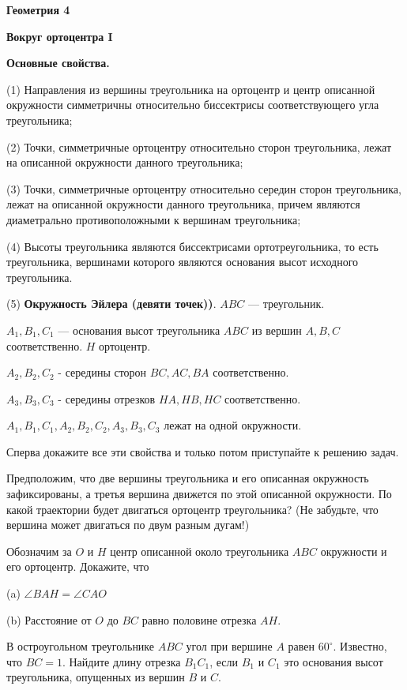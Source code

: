 \centerline{\bf \Huge Геометрия 4}
\centerline{\bf \Huge Вокруг ортоцентра I}

\textbf{Основные свойства.}

(1) Направления из вершины треугольника на ортоцентр и центр описанной окружности симметричны относительно биссектрисы соответствующего угла треугольника;

(2) Точки, симметричные ортоцентру относительно сторон треугольника, лежат на описанной окружности данного треугольника;

(3) Точки, симметричные ортоцентру относительно середин сторон треугольника, лежат на описанной окружности данного треугольника, причем являются диаметрально противоположными к вершинам треугольника;

(4) Высоты треугольника являются биссектрисами ортотреугольника, то есть треугольника, вершинами которого являются основания высот исходного треугольника.

(5) \textbf{Окружность Эйлера (девяти точек))}. $A B C$ --- треугольник.

$A_1, B_1, C_1$ --- основания высот треугольника $A B C$ из вершин $A, B, C$ соответственно. $H$ ортоцентр.

$A_2, B_2, C_2$ - середины сторон $B C, A C, B A$ соответственно.

$A_3, B_3, C_3$ - середины отрезков $H A, H B, H C$ соответственно.

$A_1, B_1, C_1, A_2, B_2, C_2, A_3, B_3, C_3$ лежат на одной окружности.

Сперва докажите все эти свойства и только потом приступайте к решению задач. 

\newpage

\hspace{3mm}

Предположим, что две вершины треугольника и его описанная окружность зафиксированы, а третья вершина движется по этой описанной окружности. По какой траектории будет двигаться ортоцентр треугольника? (Не забудьте, что вершина может двигаться по двум разным дугам!)

Обозначим за $O$ и $H$ центр описанной около треугольника $A B C$ окружности и его ортоцентр. Докажите, что

(a) $\angle B A H=\angle C A O$

(b) Расстояние от $O$ до $B C$ равно половине отрезка $A H$.

В остроугольном треугольнике $A B C$ угол при вершине $A$ равен $60^{\circ}$. Известно, что $B C=1$. Найдите длину отрезка $B_1 C_1$, если $B_1$ и $C_1$ это основания высот треугольника, опущенных из вершин $B$ и $C$.

